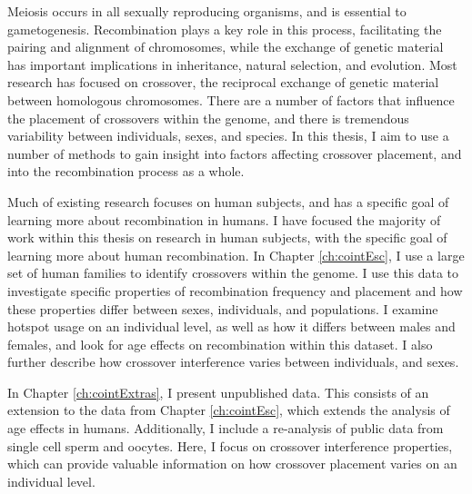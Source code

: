 

Meiosis occurs in all sexually reproducing organisms, and is essential to gametogenesis.
Recombination plays a key role in this process, facilitating the pairing and alignment of chromosomes, while the exchange of genetic material has important implications in inheritance, natural selection, and evolution.
Most research  has focused on crossover, the reciprocal exchange of genetic material between homologous chromosomes.
There are a number of factors that influence the placement of crossovers within the genome, and there is tremendous variability between individuals, sexes, and species.
In this thesis, I aim to use a number of methods to gain insight into factors affecting crossover placement, and into the recombination process as a whole.

Much of existing research focuses on human subjects, and has a specific goal of learning more about recombination in humans.
I have focused the majority of work within this thesis on research in human subjects, with the specific goal of learning more about human recombination.
In Chapter \ref{ch:cointEsc}, I use a large set of human families to identify crossovers within the genome.
I use this data to investigate specific properties of recombination frequency and placement and how these properties differ between sexes, individuals, and populations.
I examine hotspot usage on an individual level, as well as how it differs between males and females, and look for age effects on recombination within this dataset.
I also further describe how crossover interference varies between individuals, and sexes.


In Chapter \ref{ch:cointExtras}, I present unpublished data.
This consists of an extension to the data from Chapter \ref{ch:cointEsc}, which extends the analysis of age effects in humans.
Additionally, I include a re-analysis of public data from single cell sperm and oocytes.
Here, I focus on crossover interference properties, which can provide valuable information on how crossover placement varies on an individual level.

